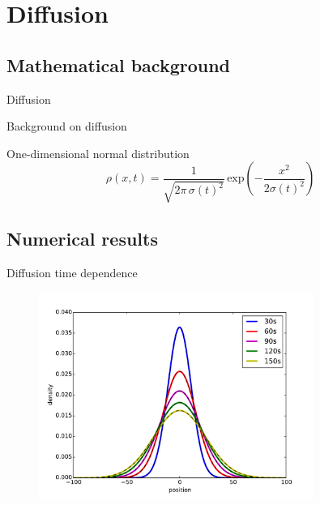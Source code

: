 \documentclass{beamer}
\begin{document}

\section{Diffusion}


\subsection{Mathematical background}

\begin{frame}{Diffusion}

Background on diffusion

One-dimensional normal distribution
\begin{equation}
	\rho(x,t) = \frac{1}{\sqrt{2 \pi \, \sigma(t)^2}} \, \text{exp} \left( - \frac{x^2}{2\sigma(t)^2} \right)
\end{equation}

\end{frame}

\subsection{Numerical results}

\begin{frame}{Diffusion time dependence}

\begin{figure}[H]
	\centering
	\includegraphics[width=0.8\textwidth]{diffusion.pdf}
\end{figure}


\end{frame}
\end{document}
